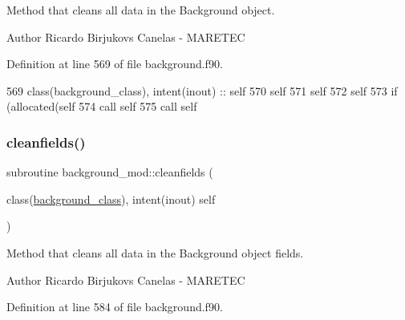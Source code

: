 Method that cleans all data in the Background object. 

\begin{DoxyAuthor}{Author}
Ricardo Birjukovs Canelas -\/ M\+A\+R\+E\+T\+EC 
\end{DoxyAuthor}


Definition at line 569 of file background.\+f90.


\begin{DoxyCode}
569     \textcolor{keywordtype}{class}(background\_class), \textcolor{keywordtype}{intent(inout)} :: self
570     self%
571     self%
572     self%
573     \textcolor{keywordflow}{if} (\textcolor{keyword}{allocated}(self%
574     \textcolor{keyword}{call }self%
575     \textcolor{keyword}{call }self%
\end{DoxyCode}
\mbox{\label{namespacebackground__mod_a843a471a68ce83809e3ed0a40886a4e7}} 
\subsubsection{\texorpdfstring{cleanfields()}{cleanfields()}}
{\footnotesize\ttfamily subroutine background\+\_\+mod\+::cleanfields (\begin{DoxyParamCaption}\item[{class(\mbox{\hyperlink{structbackground__mod_1_1background__class}{background\+\_\+class}}), intent(inout)}]{self }\end{DoxyParamCaption})\hspace{0.3cm}{\ttfamily [private]}}



Method that cleans all data in the Background object fields. 

\begin{DoxyAuthor}{Author}
Ricardo Birjukovs Canelas -\/ M\+A\+R\+E\+T\+EC 
\end{DoxyAuthor}


Definition at line 584 of file background.\+f90.


